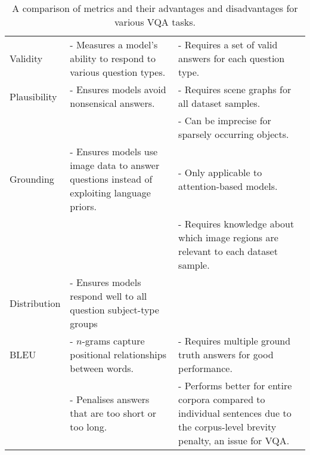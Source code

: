 \begin{table}[htbp]
\begin{xltabular}{\linewidth}{@{}lLL@{}}
Validity                            & - Measures a model's ability to respond to various question types.                         & - Requires a set of valid answers for each question type.                                                                                                               \\
Plausibility                        & - Ensures models avoid nonsensical answers.                                                & - Requires scene graphs for all dataset samples.                                                                                                                        \\
                                    &                                                                                            & - Can be imprecise for sparsely occurring objects.                                                                                                                      \\
Grounding                           & - Ensures models use image data to answer questions instead of exploiting language priors. & - Only applicable to attention-based models.                                                                                                                            \\
                                    &                                                                                            & - Requires knowledge about which image regions are relevant to each dataset sample.                                                                                     \\
Distribution                        & - Ensures models respond well to all question subject-type groups                          &                                                                                                                                                                         \\
BLEU                                & - \(n\)-grams capture positional relationships between words.                              & - Requires multiple ground truth answers for good performance.                                                                                                          \\
                                    & - Penalises answers that are too short or too long.                                        & - Performs better for entire corpora compared to individual sentences due to the corpus-level brevity penalty, an issue for VQA.                                        \\ \bottomrule

    \end{xltabular}
 \caption[Advantages and disadvantages of metrics for various VQA tasks]{A comparison of metrics and their advantages and disadvantages for various VQA tasks.}
\label{tab:vqa_metrics_comparison}
\end{table}

